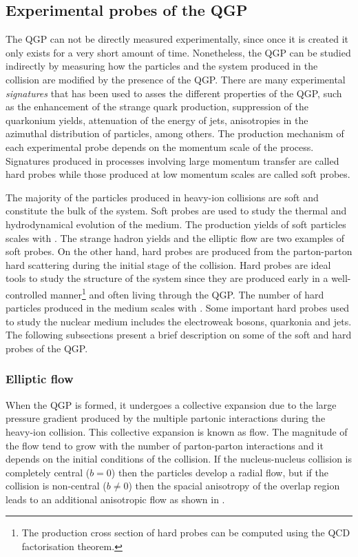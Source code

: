 \subsection{Experimental probes of the QGP}

The QGP can not be directly measured experimentally, since once it is created it only exists for a very short amount of time. Nonetheless, the QGP can be studied indirectly by measuring how the particles and the system produced in the collision are modified by the presence of the QGP. There are many experimental \textit{signatures} that has been used to asses the different properties of the QGP, such as the enhancement of the strange quark production, suppression of the quarkonium yields, attenuation of the energy of jets, anisotropies in the azimuthal distribution of particles, among others. The production mechanism of each experimental probe depends on the momentum scale of the process. Signatures produced in processes involving large momentum transfer are called hard probes while those produced at low momentum scales are called soft probes.

The majority of the particles produced in heavy-ion collisions are soft and constitute the bulk of the system. Soft probes are used to study the thermal and hydrodynamical evolution of the medium. The production yields of soft particles scales with \npart. The strange hadron yields and the elliptic flow are two examples of soft probes. On the other hand, hard probes are produced from the parton-parton hard scattering during the initial stage of the collision. Hard probes are ideal tools to study the structure of the system since they are produced early in a well-controlled manner\footnote{The production cross section of hard probes can be computed using the QCD factorisation theorem.} and often living through the QGP. The number of hard particles produced in the medium  scales with \ncoll. Some important hard probes used to study the nuclear medium includes the electroweak bosons, quarkonia and jets. The following subsections present a brief description on some of the soft and hard probes of the QGP.


\subsubsection{Elliptic flow}

When the QGP is formed, it undergoes a collective expansion due to the large pressure gradient produced by the multiple partonic interactions during the heavy-ion collision. This collective expansion is known as flow. The magnitude of the flow tend to grow with the number of parton-parton interactions and it depends on the initial conditions of the collision. If the nucleus-nucleus collision is completely central ($b = 0$) then the particles develop a radial flow, but if the collision is non-central ($b \neq 0$) then the spacial anisotropy of the overlap region leads to an additional anisotropic flow as shown in .

